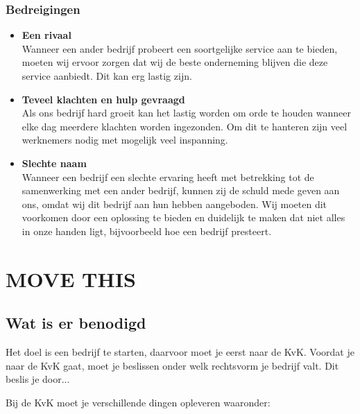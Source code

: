 \documentclass[11pt,oneside,a4paper,numbers=enddot]{report} %
\begin{document}
\subsection{Bedreigingen}
\begin{itemize}
\item {\bf Een rivaal} \\
  Wanneer een ander bedrijf probeert een soortgelijke service aan te bieden, moeten wij ervoor zorgen dat wij de beste onderneming blijven die deze service aanbiedt. Dit kan erg lastig zijn.
\item {\bf Teveel klachten en hulp gevraagd} \\
  Als ons bedrijf hard groeit kan het lastig worden om orde te houden wanneer elke dag meerdere klachten worden ingezonden. Om dit te hanteren zijn veel werknemers nodig met mogelijk veel inspanning. 
\item {\bf Slechte naam} \\
  Wanneer een bedrijf een slechte ervaring heeft met betrekking tot de samenwerking met een ander bedrijf, kunnen zij de schuld mede geven aan ons, omdat wij dit bedrijf aan hun hebben aangeboden. Wij moeten dit voorkomen door een oplossing te bieden en duidelijk te maken dat niet alles in onze handen ligt, bijvoorbeeld hoe een bedrijf presteert.
\end{itemize}

\chapter{MOVE THIS}
\section{Wat is er benodigd}

Het doel is een bedrijf te starten, daarvoor moet je eerst naar de KvK.
Voordat je naar de KvK gaat, moet je beslissen onder welk rechtsvorm je bedrijf valt.
Dit beslis je door... 

Bij de KvK moet je verschillende dingen opleveren waaronder:
\end{document}
